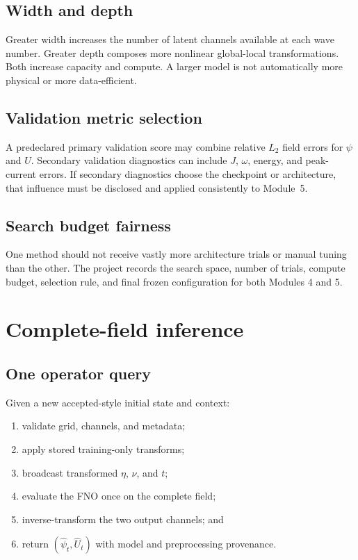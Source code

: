 \documentclass[11pt]{article}
\begin{document}
\subsection{Width and depth}
Greater width increases the number of latent channels available at each wave number. Greater depth composes more nonlinear global-local transformations. Both increase capacity and compute. A larger model is not automatically more physical or more data-efficient.

\subsection{Validation metric selection}
A predeclared primary validation score may combine relative $L_2$ field errors for $\psi$ and $U$. Secondary validation diagnostics can include $J$, $\omega$, energy, and peak-current errors. If secondary diagnostics choose the checkpoint or architecture, that influence must be disclosed and applied consistently to Module~5.

\subsection{Search budget fairness}
One method should not receive vastly more architecture trials or manual tuning than the other. The project records the search space, number of trials, compute budget, selection rule, and final frozen configuration for both Modules 4 and 5.

\section{Complete-field inference}
\label{sec:inference}

\subsection{One operator query}
Given a new accepted-style initial state and context:
\begin{enumerate}
  \item validate grid, channels, and metadata;
  \item apply stored training-only transforms;
  \item broadcast transformed $\eta$, $\nu$, and $t$;
  \item evaluate the FNO once on the complete field;
  \item inverse-transform the two output channels; and
  \item return $(\widehat\psi_t,\widehat U_t)$ with model and preprocessing provenance.
\end{enumerate}
\end{document}
